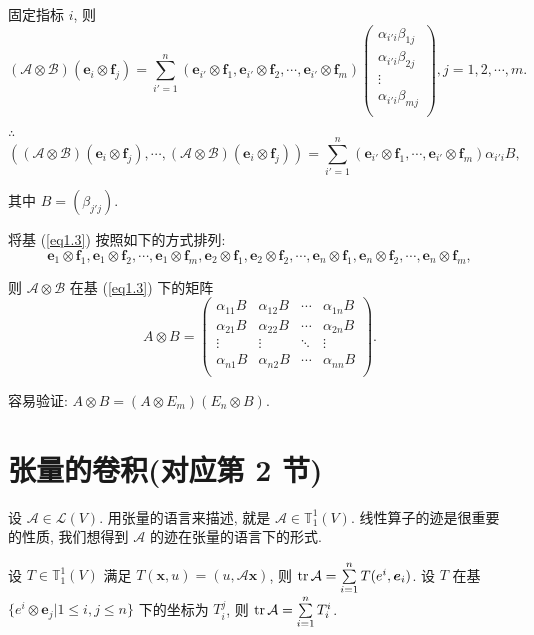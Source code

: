 \documentclass{ctexart}
\begin{document}
固定指标 $i$, 则
\[(\mathcal{A}\otimes\mathcal{B})(\boldsymbol{e}_i\otimes\boldsymbol{f}_j)=\sum\limits_{i'=1}^n(\boldsymbol{e}_{i'}\otimes\boldsymbol{f}_1,\boldsymbol{e}_{i'}\otimes\boldsymbol{f}_2,\cdots,\boldsymbol{e}_{i'}\otimes\boldsymbol{f}_m)\begin{pmatrix}
    \alpha_{i'i}\beta_{1j} \\
    \alpha_{i'i}\beta_{2j} \\
    \vdots \\
    \alpha_{i'i}\beta_{mj} \\
\end{pmatrix}, j=1,2,\cdots,m.\]

$\therefore$
\[((\mathcal{A}\otimes\mathcal{B})(\boldsymbol{e}_i\otimes\boldsymbol{f}_j),\cdots,(\mathcal{A}\otimes\mathcal{B})(\boldsymbol{e}_i\otimes\boldsymbol{f}_j))=\sum\limits_{i'=1}^n(\boldsymbol{e}_{i'}\otimes\boldsymbol{f}_1,\cdots,\boldsymbol{e}_{i'}\otimes\boldsymbol{f}_m)\alpha_{i'i}B,\]

其中 $B=(\beta_{j'j})$.

将基 (\ref{eq1.3}) 按照如下的方式排列:
\[\boldsymbol{e}_1\otimes\boldsymbol{f}_1,\boldsymbol{e}_1\otimes\boldsymbol{f}_2,\cdots,\boldsymbol{e}_1\otimes\boldsymbol{f}_m,\boldsymbol{e}_2\otimes\boldsymbol{f}_1,\boldsymbol{e}_2\otimes\boldsymbol{f}_2,\cdots,\boldsymbol{e}_n\otimes\boldsymbol{f}_1,\boldsymbol{e}_n\otimes\boldsymbol{f}_2,\cdots,\boldsymbol{e}_n\otimes\boldsymbol{f}_m,\]

则
$\mathcal{A}\otimes\mathcal{B}$ 在基 (\ref{eq1.3}) 下的矩阵
\[A\otimes B=\begin{pmatrix}
    \alpha_{11}B & \alpha_{12}B & \cdots & \alpha_{1n}B \\
    \alpha_{21}B & \alpha_{22}B & \cdots & \alpha_{2n}B \\
    \vdots & \vdots & \ddots & \vdots \\
    \alpha_{n1}B & \alpha_{n2}B & \cdots & \alpha_{nn}B \\
\end{pmatrix}.\]

容易验证: $A\otimes B=(A\otimes E_m)(E_n\otimes B)$.
\section{张量的卷积(对应第 2 节)}
设 $\mathcal{A}\in\mathcal{L}(V)$. 用张量的语言来描述, 就是 $\mathcal{A}\in\mathbb{T}_1^1(V)$. 线性算子的迹是很重要的性质, 我们想得到 $\mathcal{A}$ 的迹在张量的语言下的形式.

设 $T\in\mathbb{T}_1^1(V)$ 满足 $T(\boldsymbol{x},u)=(u,\mathcal{A}\boldsymbol{x})$, 则 $\operatorname{tr} \mathcal{A}=\sum\limits_{i=1}^nT(e^i,\boldsymbol{e}_i)$. 设 $T$ 在基 $\{e^i\otimes\boldsymbol{e}_j|1\leq i,j\leq n\}$ 下的坐标为 $T_i^j$, 则 $\operatorname{tr} \mathcal{A}=\sum\limits_{i=1}^nT_i^i$.
\end{document}
